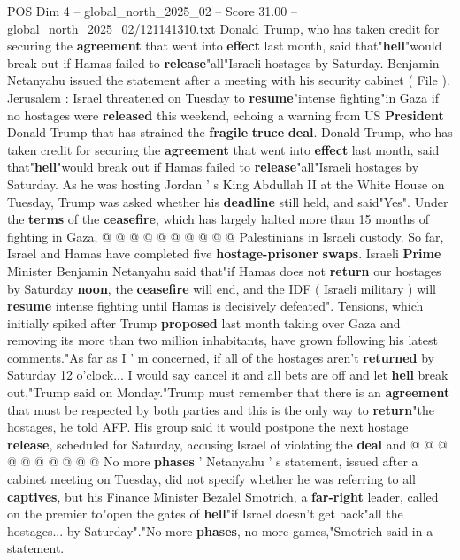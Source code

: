 \begin{textsample}{POS Dim 4 – global\_north\_2025\_02 – Score 31.00 – global\_north\_2025\_02/121141310.txt}  \label{ex:f4_pos_058}
Donald Trump, who has taken credit for securing the \textbf{agreement} that went into \textbf{effect} last month, said that"\textbf{hell}"would break out if Hamas failed to \textbf{release}"all"Israeli hostages by Saturday.
Benjamin Netanyahu issued the statement after a meeting with his security cabinet ( File ).
Jerusalem : Israel threatened on Tuesday to \textbf{resume}"intense fighting"in Gaza if no hostages were \textbf{released} this weekend, echoing a warning from US \textbf{President} Donald Trump that has strained the \textbf{fragile} \textbf{truce} \textbf{deal}.
Donald Trump, who has taken credit for securing the \textbf{agreement} that went into \textbf{effect} last month, said that"\textbf{hell}"would break out if Hamas failed to \textbf{release}"all"Israeli hostages by Saturday.
As he was hosting Jordan ' s King Abdullah II at the White House on Tuesday, Trump was asked whether his \textbf{deadline} still held, and said"Yes".
Under the \textbf{terms} of the \textbf{ceasefire}, which has largely halted more than 15 months of fighting in Gaza, @ @ @ @ @ @ @ @ @ @ Palestinians in Israeli custody.
So far, Israel and Hamas have completed five \textbf{hostage-prisoner} \textbf{swaps}.
Israeli \textbf{Prime} Minister Benjamin Netanyahu said that"if Hamas does not \textbf{return} our hostages by Saturday \textbf{noon}, the \textbf{ceasefire} will end, and the IDF ( Israeli military ) will \textbf{resume} intense fighting until Hamas is decisively defeated".
Tensions, which initially spiked after Trump \textbf{proposed} last month taking over Gaza and removing its more than two million inhabitants, have grown following his latest comments."As far as I ' m concerned, if all of the hostages aren't \textbf{returned} by Saturday 12 o'clock...
I would say cancel it and all bets are off and let \textbf{hell} break out,"Trump said on Monday."Trump must remember that there is an \textbf{agreement} that must be respected by both parties and this is the only way to \textbf{return}"the hostages, he told AFP.
His group said it would postpone the next hostage \textbf{release}, scheduled for Saturday, accusing Israel of violating the \textbf{deal} and @ @ @ @ @ @ @ @ @ @ No more \textbf{phases} ' Netanyahu ' s statement, issued after a cabinet meeting on Tuesday, did not specify whether he was referring to all \textbf{captives}, but his Finance Minister Bezalel Smotrich, a \textbf{far-right} leader, called on the premier to"open the gates of \textbf{hell}"if Israel doesn't get back"all the hostages... by Saturday"."No more \textbf{phases}, no more games,"Smotrich said in a statement.

\end{textsample}
